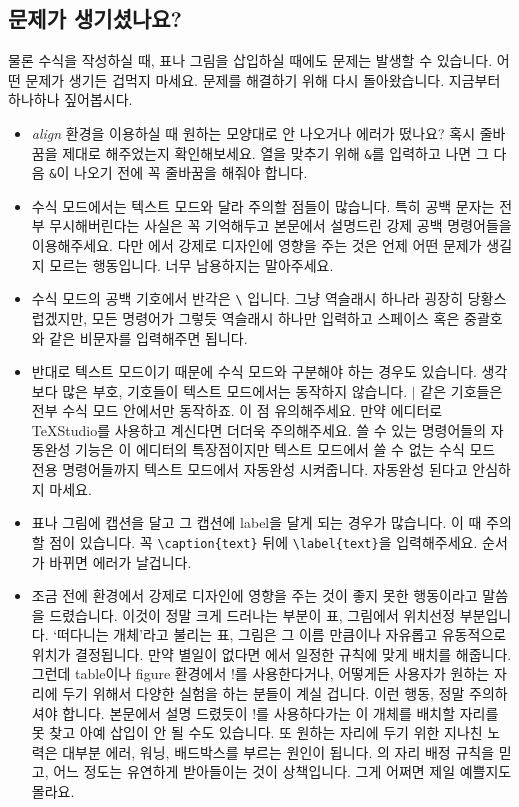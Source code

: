 \subsection{문제가 생기셨나요?}
\label{subsec:problem4}
물론 수식을 작성하실 때, 표나 그림을 삽입하실 때에도 문제는 발생할 수 있습니다.
어떤 문제가 생기든 겁먹지 마세요.
문제를 해결하기 위해 다시 돌아왔습니다.
지금부터 하나하나 짚어봅시다.
\begin{itemize}
	\item \emph{align} 환경을 이용하실 때 원하는 모양대로 안 나오거나 에러가 떴나요?
	혹시 줄바꿈을 제대로 해주었는지 확인해보세요.
	열을 맞추기 위해 \verb|&|를 입력하고 나면 그 다음 \verb|&|이 나오기 전에 꼭 줄바꿈을 해줘야 합니다.

	\item 수식 모드에서는 텍스트 모드와 달라 주의할 점들이 많습니다.
	특히 공백 문자는 전부 무시해버린다는 사실은 꼭 기억해두고 본문에서 설명드린 강제 공백 명령어들을 이용해주세요.
	다만 \lt 에서 강제로 디자인에 영향을 주는 것은 언제 어떤 문제가 생길지 모르는 행동입니다.
	너무 남용하지는 말아주세요.
	
	\item 수식 모드의 공백 기호에서 반각은 \verb|\| 입니다.
	그냥 역슬래시 하나라 굉장히 당황스럽겠지만, 모든 명령어가 그렇듯 역슬래시 하나만 입력하고 스페이스 혹은 중괄호와 같은 비문자를 입력해주면 됩니다.
	
	\item 반대로 텍스트 모드이기 때문에 수식 모드와 구분해야 하는 경우도 있습니다.
	생각보다 많은 부호, 기호들이 텍스트 모드에서는 동작하지 않습니다.
	$\mid$ 같은 기호들은 전부 수식 모드 안에서만 동작하죠.
	이 점 유의해주세요.
	만약 에디터로 \TeX Studio를 사용하고 계신다면 더더욱 주의해주세요.
	쓸 수 있는 명령어들의 자동완성 기능은 이 에디터의 특장점이지만 텍스트 모드에서 쓸 수 없는 수식 모드 전용 명령어들까지 텍스트 모드에서 자동완성 시켜줍니다.
	자동완성 된다고 안심하지 마세요.
	
	\item 표나 그림에 캡션을 달고 그 캡션에 label을 달게 되는 경우가 많습니다.
	이 때 주의할 점이 있습니다.
	꼭 \verb|\caption{text}| 뒤에 \verb|\label{text}|을 입력해주세요.
	순서가 바뀌면 에러가 날겁니다.
	
	\item 조금 전에 \lt 환경에서 강제로 디자인에 영향을 주는 것이 좋지 못한 행동이라고 말씀을 드렸습니다.
	이것이 정말 크게 드러나는 부분이 표, 그림에서 위치선정 부분입니다.
	`떠다니는 개체'라고 불리는 표, 그림은 그 이름 만큼이나 자유롭고 유동적으로 위치가 결정됩니다.
	만약 별일이 없다면 \lt 에서 일정한 규칙에 맞게 배치를 해줍니다.
	그런데 table이나 figure 환경에서 !를 사용한다거나, 어떻게든 사용자가 원하는 자리에 두기 위해서 다양한 실험을 하는 분들이 계실 겁니다.
	이런 행동, 정말 주의하셔야 합니다.
	본문에서 설명 드렸듯이 !를 사용하다가는 \lt 이 개체를 배치할 자리를 못 찾고 아예 삽입이 안 될 수도 있습니다.
	또 원하는 자리에 두기 위한 지나친 노력은 대부분 에러, 워닝, 배드박스를 부르는 원인이 됩니다.
	\lt 의 자리 배정 규칙을 믿고, 어느 정도는 유연하게 받아들이는 것이 상책입니다.
	그게 어쩌면 제일 예쁠지도 몰라요.
	

\end{itemize}

